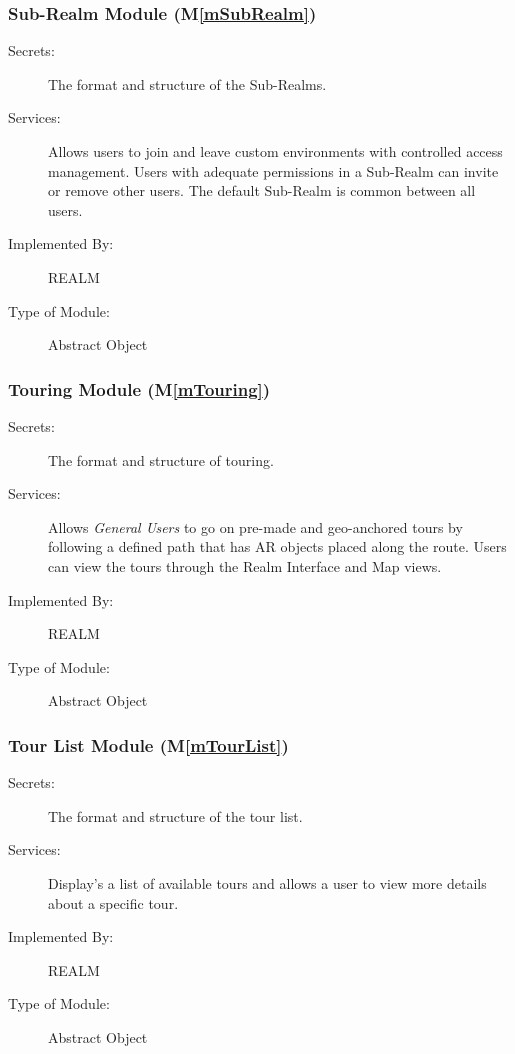 \documentclass[12pt, titlepage]{article}
\newcommand{\mref}[1]{M\ref{#1}}
\begin{document}
\subsubsection{Sub-Realm Module (\mref{mSubRealm})}

\begin{description}
\item[Secrets:]The format and structure of the Sub-Realms.
\item[Services:]Allows users to join and leave custom environments with controlled access management. Users with adequate permissions in a Sub-Realm can invite or remove other users. The default Sub-Realm is common between all users.
\item[Implemented By:]REALM
\item[Type of Module:]Abstract Object
\end{description}

\subsubsection{Touring Module (\mref{mTouring})}

\begin{description}
\item[Secrets:]The format and structure of touring.
\item[Services:]Allows \textit{General Users} to go on pre-made and geo-anchored tours by following a defined path that has AR objects placed along the route. Users can view the tours through the Realm Interface and Map views.
\item[Implemented By:]REALM
\item[Type of Module:]Abstract Object
\end{description}

\subsubsection{Tour List Module (\mref{mTourList})}

\begin{description}
\item[Secrets:]The format and structure of the tour list.
\item[Services:]Display's a list of available tours and allows a user to view more details about a specific tour.
\item[Implemented By:]REALM
\item[Type of Module:]Abstract Object
\end{description}
\end{document}
